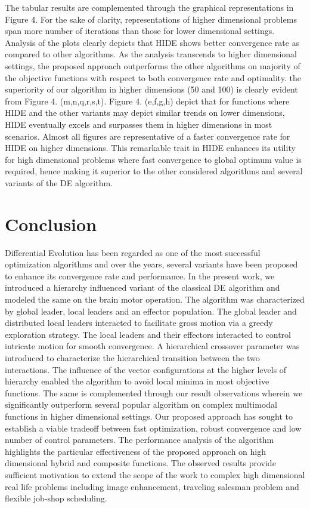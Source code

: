 \documentclass[a4paper,twoside]{article}
\begin{document}
The tabular results are complemented through the graphical representations in Figure 4. For the sake of clarity, representations of higher dimensional problems span more number of iterations than those for lower dimensional settings. Analysis of the plots clearly depicts that HIDE shows better convergence rate as compared to other algorithms. As the analysis transcends to higher dimensional settings, the proposed approach outperforms the other algorithms on majority of the objective functions with respect to both convergence rate and optimality. the superiority of our algorithm in higher dimensions (50 and 100) is clearly evident from Figure 4. (m,n,q,r,s,t). Figure 4. (e,f,g,h) depict that for functions where HIDE and the other variants may depict similar trends on lower dimensions, HIDE eventually excels and surpasses them in higher dimensions in most scenarios. Almost all figures are representative of a faster convergence rate for HIDE on higher dimensions. This remarkable trait in HIDE enhances its utility for high dimensional problems where fast convergence to global optimum value is required, hence making it superior to the other considered algorithms and several variants of the DE algorithm.


\section{Conclusion}

Differential Evolution has been regarded as one of the most successful optimization algorithms
and over the years, several variants have been proposed to enhance its convergence rate and performance. In the present work, we introduced a hierarchy influenced variant of the classical DE algorithm and modeled the same on the brain motor operation. The algorithm was characterized by global leader, local leaders and an effector population. The global leader and distributed local leaders interacted to facilitate gross motion via a greedy exploration strategy. The local leaders and their effectors interacted to control intricate motion for smooth convergence. A hierarchical crossover parameter was introduced to characterize the hierarchical transition between the two interactions. The influence of the vector configurations at the higher levels of hierarchy enabled the algorithm to avoid local minima in most objective functions. The same is complemented through our result observations wherein we significantly outperform several popular algorithm on complex multimodal functions in higher dimensional settings.
Our proposed approach has sought to establish a viable tradeoff between fast optimization, robust convergence and low number of control parameters.
The performance analysis of the algorithm highlights the particular effectiveness of the proposed approach on high dimensional hybrid and composite functions. The observed results provide sufficient motivation to extend the scope of the work to complex high dimensional real life problems including image enhancement, traveling salesman problem and flexible job-shop scheduling.
\end{document}
